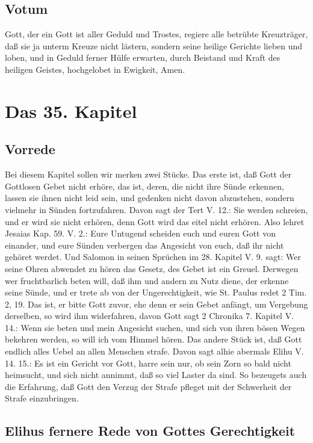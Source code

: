 \section{Votum}

Gott, der ein Gott ist aller Geduld und Trostes, regiere alle betrübte Kreuzträger, daß sie ja unterm Kreuze nicht lästern, sondern seine heilige Gerichte lieben und loben, und in Geduld ferner Hülfe erwarten, durch Beistand und Kraft des heiligen Geistes, hochgelobet in Ewigkeit, Amen.

\chapter{Das 35. Kapitel}

\section{Vorrede}

Bei diesem Kapitel sollen wir merken zwei Stücke. Das erste ist, daß Gott der Gottlosen Gebet nicht erhöre, das ist, deren, die nicht ihre Sünde erkennen, lassen sie ihnen nicht leid sein, und gedenken nicht davon abzustehen, sondern vielmehr in Sünden fortzufahren. Davon sagt der Tert V. 12.: Sie werden schreien, und er wird sie nicht erhören, denn Gott wird das eitel nicht erhören. Also lehret Jesaias Kap. 59. V. 2.: Eure Untugend scheiden euch und euren Gott von einander, und eure Sünden verbergen das Angesicht von euch, daß ihr nicht gehöret werdet. Und Salomon in seinen Sprüchen im 28. Kapitel V. 9. sagt: Wer seine Ohren abwendet zu hören das Gesetz, des Gebet ist ein Greuel. Derwegen wer fruchtbarlich beten will, daß ihm und andern zu Nutz diene, der erkenne seine Sünde, und er trete ab von der Ungerechtigkeit, wie St. Paulus redet 2 Tim. 2, 19. Das ist, er bitte Gott zuvor, ehe denn er sein Gebet anfängt, um Vergebung derselben, so wird ihm widerfahren, davon Gott sagt 2 Chronika 7. Kapitel V. 14.: Wenn sie beten und mein Angesicht suchen, und sich von ihren bösen Wegen bekehren werden, so will ich vom Himmel hören. Das andere Stück ist, daß Gott endlich alles Uebel an allen Menschen strafe. Davon sagt alhie abermals Elihu V. 14. 15.: Es ist ein Gericht vor Gott, harre sein nur, ob sein Zorn so bald nicht heimsucht, und sich nicht annimmt, daß so viel Laster da sind. So bezeugets auch die Erfahrung, daß Gott den Verzug der Strafe pfleget mit der Schwerheit der Strafe einzubringen.

\section{Elihus fernere Rede von Gottes Gerechtigkeit}


